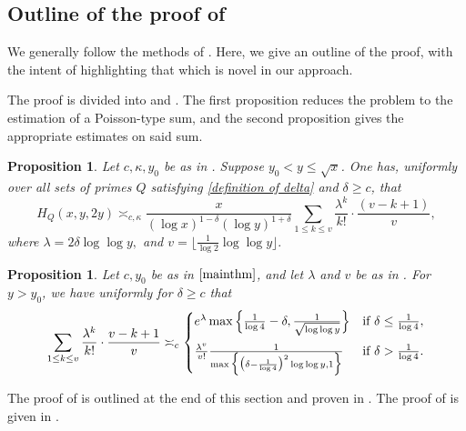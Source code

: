 \documentclass{amsart}
\newtheorem{proposition}[theorem]{Proposition}
\theoremstyle{definition}
\numberwithin{equation}{section}
\newcommand{\density}{\delta}
\begin{document}
	\subsection*{Outline of the proof of } 
	We generally follow the methods of \cite{ford2008distribution}. Here, we give an outline of the proof, with the intent of highlighting that which is novel in our approach. 
	
	The proof is divided into  and . The first proposition reduces the problem to the estimation of a Poisson-type sum, and the second proposition gives the appropriate estimates on said sum. 
	\begin{proposition}\label{prop 1.4}
		Let $c,\kappa, y_0$ be as in . Suppose $y_0 < y \leq \sqrt{x}$. One has, uniformly over all sets of primes $Q$ satisfying \eqref{definition of delta} and $\delta \ge c$, that
		\begin{equation}\label{main lemma}
			H_Q(x,y,2y) \asymp_{c,\kappa} \frac{x}{(\log x)^{1-\density}(\log y)^{1+\density}} \sum_{1 \leq k \leq v}\frac{\lambda^k}{k!}\cdot\frac{(v-k+1)}{v},
		\end{equation}
		where $\lambda = 2 \density \log \log y,$ and $v =  \lfloor\frac{1}{\log 2}\log \log y\rfloor.$
	\end{proposition}
	
	\begin{proposition}\label{prop 1.5}
		Let $c,y_0$ be as in $\Cref{mainthm}$, and let $\lambda$ and $v$ be as in . For $y > y_0$, we have uniformly for $\density \ge c$ that
		\begin{equation}
			\sum_{1 \leq k \leq v} \frac{\lambda^k}{k!}\cdot\frac{v-k+1}{v} \asymp_c \begin{cases}
				e^\lambda \max\Big\{\frac{1}{\log 4} - \density, \frac{1}{\sqrt{\log \log y}}\Big\} & \text{if } \density \leq \frac{1}{\log 4}, \\
				\noalign{\vskip 5pt}
				\frac{\lambda^v}{v!} \frac{1}{\max\Big\{\big(\density - \frac{1}{\log 4}\big)^2 \log \log y, 1\Big\}} & \text{if } \density > \frac{1}{\log 4}.
			\end{cases}
		\end{equation}
	\end{proposition}
	The proof of  is outlined at the end of this section and proven in . The proof of  is given in .
	
\end{document}
